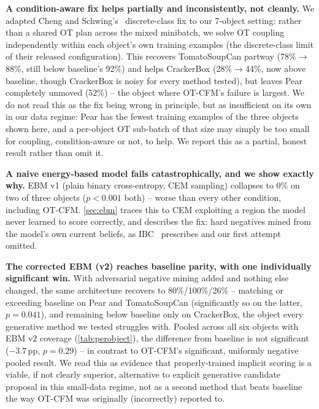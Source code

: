 \documentclass[journal]{IEEEtran}
\begin{document}
\noindent\textbf{A condition-aware fix helps partially and inconsistently,
not cleanly.} We adapted Cheng and Schwing's~\cite{cheng2025curse}
discrete-class fix to our 7-object setting: rather than a shared OT plan
across the mixed minibatch, we solve OT coupling independently within each
object's own training examples (the discrete-class limit of their released
configuration). This recovers TomatoSoupCan partway (78\%$\to$88\%, still
below baseline's 92\%) and helps CrackerBox (28\%$\to$44\%, now above
baseline, though CrackerBox is noisy for every method tested), but leaves
Pear completely unmoved (52\%) -- the object where OT-CFM's failure is
largest. We do not read this as the fix being wrong in principle, but as
insufficient on its own in our data regime: Pear has the fewest training
examples of the three objects shown here, and a per-object OT sub-batch of
that size may simply be too small for coupling, condition-aware or not, to
help. We report this as a partial, honest result rather than omit it.

\noindent\textbf{A naive energy-based model fails catastrophically, and we
show exactly why.} EBM v1 (plain binary cross-entropy, CEM sampling)
collapses to 0\% on two of three objects ($p{<}0.001$ both) -- worse than
every other condition, including OT-CFM. \cref{sec:ebm} traces this to CEM
exploiting a region the model never learned to score correctly, and
describes the fix: hard negatives mined from the model's own current
beliefs, as IBC~\cite{florence2021implicit} prescribes and our first
attempt omitted.

\noindent\textbf{The corrected EBM (v2) reaches baseline parity, with one
individually significant win.} With adversarial negative mining added and
nothing else changed, the same architecture recovers to 80\%/100\%/26\% --
matching or exceeding baseline on Pear and TomatoSoupCan (significantly so
on the latter, $p{=}0.041$), and remaining below baseline only on
CrackerBox, the object every generative method we tested struggles with.
Pooled across all six objects with EBM v2 coverage (\cref{tab:perobject}),
the difference from baseline is not significant ($-3.7$\,pp, $p{=}0.29$) --
in contrast to OT-CFM's significant, uniformly negative pooled result. We
read this as evidence that properly-trained implicit scoring is a viable,
if not clearly superior, alternative to explicit generative candidate
proposal in this small-data regime, not as a second method that beats
baseline the way OT-CFM was originally (incorrectly) reported to.
\end{document}
